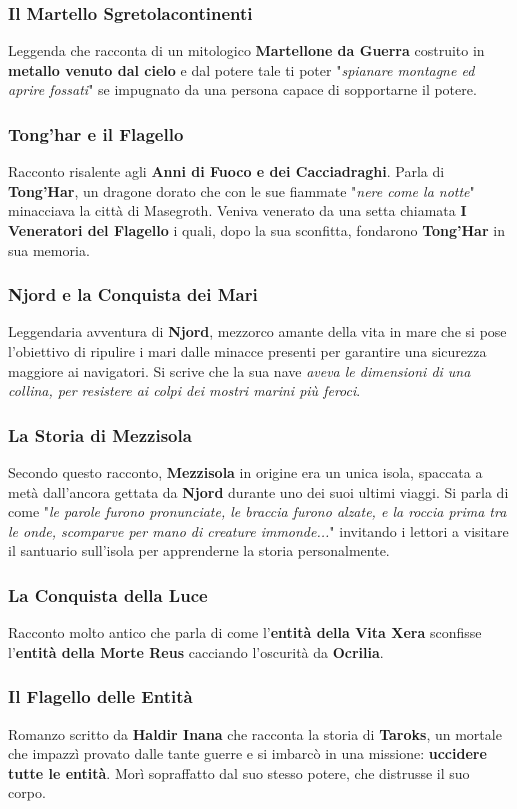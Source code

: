 \documentclass[10pt,twoside,onecolumn,openany]{book}
\begin{document}
\subsubsection{Il Martello Sgretolacontinenti}
Leggenda che racconta di un mitologico \textbf{Martellone da Guerra} costruito in \textbf{metallo venuto dal cielo} e dal potere tale ti poter "\textit{spianare montagne ed aprire fossati}" se impugnato da una persona capace di sopportarne il potere.
\subsubsection{Tong'har e il Flagello}
Racconto risalente agli \textbf{Anni di Fuoco e dei Cacciadraghi}. Parla di \textbf{Tong'Har}, un dragone dorato che con le sue fiammate "\textit{nere come la notte}" minacciava la città di Masegroth. Veniva venerato da una setta chiamata \textbf{I Veneratori del Flagello} i quali, dopo la sua sconfitta, fondarono \textbf{Tong'Har} in sua memoria.
\subsubsection{Njord e la Conquista dei Mari}
Leggendaria avventura di \textbf{Njord}, mezzorco amante della vita in mare che si pose l'obiettivo di ripulire i mari dalle minacce presenti per garantire una sicurezza maggiore ai navigatori. Si scrive che la sua nave \textit{aveva le dimensioni di una collina, per resistere ai colpi dei mostri marini più feroci}.
\subsubsection{La Storia di Mezzisola}
Secondo questo racconto, \textbf{Mezzisola} in origine era un unica isola, spaccata a metà dall'ancora gettata da \textbf{Njord} durante uno dei suoi ultimi viaggi. Si parla di come "\textit{le parole furono pronunciate, le braccia furono alzate, e la roccia prima tra le onde, scomparve per mano di creature immonde...}" invitando i lettori a visitare il santuario sull'isola per apprenderne la storia personalmente.
\subsubsection{La Conquista della Luce} Racconto molto antico che parla di come l'\textbf{entità della Vita Xera} sconfisse l'\textbf{entità della Morte Reus} cacciando l'oscurità da \textbf{Ocrilia}.
\subsubsection{Il Flagello delle Entità} Romanzo scritto da \textbf{Haldir Inana} che racconta la storia di \textbf{Taroks}, un mortale che impazzì provato dalle tante guerre e si imbarcò in una missione: \textbf{uccidere tutte le entità}. Morì sopraffatto dal suo stesso potere, che distrusse il suo corpo.
\end{document}
